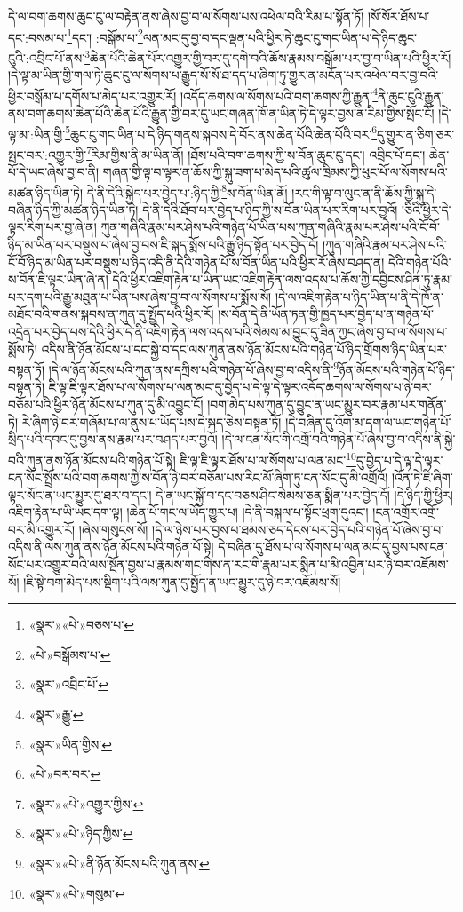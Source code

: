 དེ་ལ་བག་ཆགས་ཆུང་ངུ་ལ་བརྟེན་ནས་ཞེས་བྱ་བ་ལ་སོགས་པས་འཕེལ་བའི་རིམ་པ་སྟོན་ཏོ། །སོ་སོར་ཐོས་པ་དང་:བསམ་པ་\footnote{«སྣར་»«པེ་»བཅས་པ་}དང་། :བསྒོམ་པ་\footnote{«པེ་»བསྒོམས་པ་}ལན་མང་དུ་བྱ་བ་དང་ལྡན་པའི་ཕྱིར་ཏེ་ཆུང་ངུ་གང་ཡིན་པ་དེ་ཉིད་ཆུང་ངུའི་:འབྲིང་པོ་ནས་\footnote{«སྣར་»འབྲིང་པོ་}ཆེན་པོའི་ཆེན་པོར་འགྱུར་གྱི་བར་དུ་དགེ་བའི་ཆོས་རྣམས་བསྒོམ་པར་བྱ་བ་ཡིན་པའི་ཕྱིར་རོ། །དེ་ལྟ་མ་ཡིན་གྱི་གལ་ཏེ་ཆུང་ངུ་ལ་སོགས་པ་རྒྱུད་སོ་སོ་ཐ་དད་པ་ཞིག་ཏུ་གྱུར་ན་མངོན་པར་འཕེལ་བར་བྱ་བའི་ཕྱིར་བསྒོམ་པ་དགོས་པ་མེད་པར་འགྱུར་རོ། །འདོད་ཆགས་ལ་སོགས་པའི་བག་ཆགས་ཀྱི་རྒྱུན་\footnote{«སྣར་»རྒྱུ་}ནི་ཆུང་ངུའི་རྒྱུན་ནས་བག་ཆགས་ཆེན་པོའི་ཆེན་པོའི་རྒྱུན་གྱི་བར་དུ་ཡང་གཞན་ཁོ་ན་ཡིན་ཏེ་དེ་ལྟར་བྱས་ན་རིམ་གྱིས་སྤོང་ངོ། །དེ་ལྟ་མ་:ཡིན་གྱི་\footnote{«སྣར་»ཡིན་གྱིས་}ཆུང་ངུ་གང་ཡིན་པ་དེ་ཉིད་གནས་སྐབས་དེ་བོར་ནས་ཆེན་པོའི་ཆེན་པོའི་བར་\footnote{«པེ་»བར་བར་}དུ་གྱུར་ན་ཅིག་ཅར་སྤང་བར་:འགྱུར་གྱི་\footnote{«སྣར་»«པེ་»འགྱུར་གྱིས་}རིམ་གྱིས་ནི་མ་ཡིན་ནོ། །ཐོས་པའི་བག་ཆགས་ཀྱི་ས་བོན་ཆུང་ངུ་དང་། འབྲིང་པོ་དང་། ཆེན་པོ་དེ་ཡང་ཞེས་བྱ་བ་ནི། གཞན་གྱི་ལྟ་བ་ལྟར་ན་ཆོས་ཀྱི་སྐུ་ཟག་པ་མེད་པའི་ཚུལ་ཁྲིམས་ཀྱི་ཕུང་པོ་ལ་སོགས་པའི་མཚན་ཉིད་ཡིན་ཏེ། དེ་ནི་དེའི་སྐྱེད་པར་བྱེད་པ་:ཉིད་ཀྱི་\footnote{«སྣར་»«པེ་»ཉིད་ཀྱིས་}ས་བོན་ཡིན་ནོ། །རང་གི་ལྟ་བ་ལུང་ན་ནི་ཆོས་ཀྱི་སྐུ་དེ་བཞིན་ཉིད་ཀྱི་མཚན་ཉིད་ཡིན་ཏེ། དེ་ནི་དེའི་ཐོབ་པར་བྱེད་པ་ཉིད་ཀྱི་ས་བོན་ཡིན་པར་རིག་པར་བྱའོ། །ཅིའི་ཕྱིར་དེ་ལྟར་རིག་པར་བྱ་ཞེ་ན། ཀུན་གཞིའི་རྣམ་པར་ཤེས་པའི་གཉེན་པོ་ཡིན་པས་ཀུན་གཞིའི་རྣམ་པར་ཤེས་པའི་ངོ་བོ་ཉིད་མ་ཡིན་པར་བསྡུས་པ་ཞེས་བྱ་བས་ཇི་སྐད་སྨོས་པའི་རྒྱུ་ཉིད་སྟོན་པར་བྱེད་དོ། །ཀུན་གཞིའི་རྣམ་པར་ཤེས་པའི་ངོ་བོ་ཉིད་མ་ཡིན་པར་བསྡུས་པ་ཉིད་འདི་ནི་དེའི་གཉེན་པོ་ས་བོན་ཡིན་པའི་ཕྱིར་རོ་ཞེས་བཤད་ན། དེའི་གཉེན་པོའི་ས་བོན་ཇི་ལྟར་ཡིན་ཞེ་ན། དེའི་ཕྱིར་འཇིག་རྟེན་པ་ཡིན་ཡང་འཇིག་རྟེན་ལས་འདས་པ་ཆོས་ཀྱི་དབྱིངས་ཤིན་ཏུ་རྣམ་པར་དག་པའི་རྒྱུ་མཐུན་པ་ཡིན་པས་ཞེས་བྱ་བ་ལ་སོགས་པ་སྨོས་སོ། །དེ་ལ་འཇིག་རྟེན་པ་ཉིད་ཡིན་པ་ནི་དེ་ཁོ་ན་མཐོང་བའི་གནས་སྐབས་ན་ཀུན་དུ་སྤྱོད་པའི་ཕྱིར་རོ། །ས་བོན་དེ་ནི་ཡོན་ཏན་གྱི་ཁྱད་པར་བྱེད་པ་ན་གཉེན་པོ་འདྲེན་པར་བྱེད་པས་དེའི་ཕྱིར་དེ་ནི་འཇིག་རྟེན་ལས་འདས་པའི་སེམས་མ་བྱུང་དུ་ཟིན་ཀྱང་ཞེས་བྱ་བ་ལ་སོགས་པ་སྨོས་ཏེ། འདིས་ནི་ཉོན་མོངས་པ་དང་སྐྱེ་བ་དང་ལས་ཀུན་ནས་ཉོན་མོངས་པའི་གཉེན་པོ་ཉིད་གྲོགས་ཉིད་ཡིན་པར་བསྟན་ཏོ། །དེ་ལ་ཉོན་མོངས་པའི་ཀུན་ནས་དཀྲིས་པའི་གཉེན་པོ་ཞེས་བྱ་བ་འདིས་ནི་\footnote{«སྣར་»«པེ་»ནི་ཉོན་མོངས་པའི་ཀུན་ནས་}ཉོན་མོངས་པའི་གཉེན་པོ་ཉིད་བསྟན་ཏེ། ཇི་ལྟ་ཇི་ལྟར་ཐོས་པ་ལ་སོགས་པ་ལན་མང་དུ་བྱེད་པ་དེ་ལྟ་དེ་ལྟར་འདོད་ཆགས་ལ་སོགས་པ་ཉེ་བར་བཅོམ་པའི་ཕྱིར་ཉོན་མོངས་པ་ཀུན་དུ་མི་འབྱུང་ངོ། །བག་མེད་པས་ཀུན་དུ་བྱུང་ན་ཡང་མྱུར་བར་རྣམ་པར་གནོན་ཏེ། རེ་ཞིག་ཉེ་བར་གཞོམ་པ་ལ་ནུས་པ་ཡོད་པས་དེ་སྐད་ཅེས་བསྟན་ཏོ། །དེ་བཞིན་དུ་འོག་མ་དག་ལ་ཡང་གཉེན་པོ་སྲིད་པའི་དབང་དུ་བྱས་ནས་རྣམ་པར་བཤད་པར་བྱའོ། །དེ་ལ་ངན་སོང་གི་འགྲོ་བའི་གཉེན་པོ་ཞེས་བྱ་བ་འདིས་ནི་སྐྱེ་བའི་ཀུན་ནས་ཉོན་མོངས་པའི་གཉེན་པོ་སྟེ། ཇི་ལྟ་ཇི་ལྟར་ཐོས་པ་ལ་སོགས་པ་ལན་མང་\footnote{«སྣར་»«པེ་»གསུམ་}དུ་བྱེད་པ་དེ་ལྟ་དེ་ལྟར་ངན་སོང་སྤྲོས་པའི་བག་ཆགས་ཀྱི་ས་བོན་ཉེ་བར་བཅོམ་པས་རིང་མོ་ཞིག་ཏུ་ངན་སོང་དུ་མི་འགྲོའོ། །འོན་ཏེ་ཇི་ཞིག་ལྟར་སོང་ན་ཡང་མྱུར་དུ་ཐར་བ་དང་། དེ་ན་ཡང་སྐྱོ་བ་དང་བཅས་ཤིང་སེམས་ཅན་སྨིན་པར་བྱེད་དོ། །དེ་ཉིད་ཀྱི་ཕྱིར། འཇིག་རྟེན་པ་ཡི་ཡང་དག་ལྟ། །ཆེན་པོ་གང་ལ་ཡོད་གྱུར་པ། །དེ་ནི་བསྐལ་པ་སྟོང་ཕྲག་དུའང་། །ངན་འགྲོར་འགྲོ་བར་མི་འགྱུར་རོ། །ཞེས་གསུངས་སོ། །དེ་ལ་ཉེས་པར་བྱས་པ་ཐམས་ཅད་དེངས་པར་བྱེད་པའི་གཉེན་པོ་ཞེས་བྱ་བ་འདིས་ནི་ལས་ཀུན་ནས་ཉོན་མོངས་པའི་གཉེན་པོ་སྟེ། དེ་བཞིན་དུ་ཐོས་པ་ལ་སོགས་པ་ལན་མང་དུ་བྱས་པས་ངན་སོང་པར་འགྱུར་བའི་ལས་སྔོན་བྱས་པ་རྣམས་གང་གིས་ན་རང་གི་རྣམ་པར་སྨིན་པ་མི་འབྱིན་པར་ཉེ་བར་འཇོམས་སོ། །ཇི་སྟེ་བག་མེད་པས་སྡིག་པའི་ལས་ཀུན་དུ་སྤྱོད་ན་ཡང་མྱུར་དུ་ཉེ་བར་འཇོམས་སོ། 